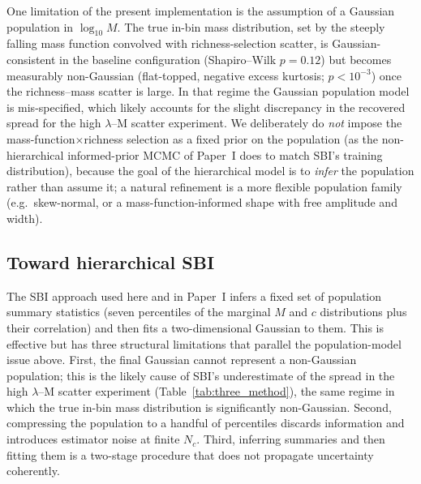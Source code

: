 \documentclass[11pt]{article}
\begin{document}
One limitation of the present implementation is the assumption of a Gaussian population in
$\log_{10}M$. The true in-bin mass distribution, set by the steeply falling mass function
convolved with richness-selection scatter, is Gaussian-consistent in the baseline configuration
(Shapiro--Wilk $p=0.12$) but becomes measurably non-Gaussian (flat-topped, negative excess
kurtosis; $p<10^{-3}$) once the richness--mass scatter is large. In that regime the Gaussian
population model is mis-specified, which likely accounts for the slight discrepancy in the
recovered spread for the high $\lambda$--M scatter experiment. We deliberately do \emph{not} impose
the mass-function$\times$richness selection as a fixed prior on the population (as the
non-hierarchical informed-prior MCMC of Paper~I does to match SBI's training distribution), because
the goal of the hierarchical model is to \emph{infer} the population rather than assume it; a
natural refinement is a more flexible population family (e.g.\ skew-normal, or a
mass-function-informed shape with free amplitude and width).

\subsection{Toward hierarchical SBI}
\label{sec:hier_sbi}

The SBI approach used here and in Paper~I infers a fixed set of population summary statistics
(seven percentiles of the marginal $M$ and $c$ distributions plus their correlation) and then fits
a two-dimensional Gaussian to them. This is effective but has three structural limitations that
parallel the population-model issue above. First, the final Gaussian cannot represent a
non-Gaussian population; this is the likely cause of SBI's underestimate of the spread in the high
$\lambda$--M scatter experiment (Table~\ref{tab:three_method}), the same regime in which the true
in-bin mass distribution is significantly non-Gaussian. Second, compressing the population to a
handful of percentiles discards information and introduces estimator noise at finite $N_c$. Third,
inferring summaries and then fitting them is a two-stage procedure that does not propagate
uncertainty coherently.
\end{document}
